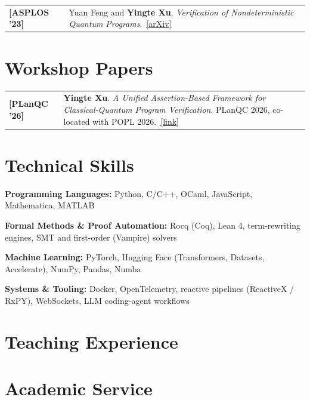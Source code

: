 \documentclass[11pt,a4paper]{moderncv}
\makeatletter
\newcommand*{\publication}[2]{%
  \begin{tabular*}{\maincolumnwidth}{%
    @{}p{2.6cm}@{}>{\raggedright\arraybackslash}p{\dimexpr\maincolumnwidth-2.6cm\relax}@{}}%
    {\bfseries #1} & #2\\%
  \end{tabular*}%
  \par\addvspace{.5em}}
\makeatother
\begin{document}
\publication{[ASPLOS '23]}{Yuan Feng and \textbf{Yingte Xu}. \emph{Verification of Nondeterministic Quantum Programs}.~\href{https://arxiv.org/abs/2302.07973}{[arXiv]}}



\section{Workshop Papers}

\publication{[PLanQC '26]}{\textbf{Yingte Xu}. \emph{A Unified Assertion-Based Framework for Classical-Quantum Program Verification}. PLanQC 2026, co-located with POPL 2026.~\href{https://popl26.sigplan.org/details/planqc-2026-papers/5/A-Unified-Assertion-Based-Framework-for-Classical-Quantum-Program-Verification}{[link]}}


\section{Technical Skills}
\textbf{Programming Languages:} Python, C/C++, OCaml, JavaScript, Mathematica, MATLAB

\textbf{Formal Methods \& Proof Automation:} Rocq (Coq), Lean 4, term-rewriting engines, SMT and first-order (Vampire) solvers

\textbf{Machine Learning:} PyTorch, Hugging Face (Transformers, Datasets, Accelerate), NumPy, Pandas, Numba

\textbf{Systems \& Tooling:} Docker, OpenTelemetry, reactive pipelines (ReactiveX / RxPY), WebSockets, LLM coding-agent workflows


\section{Teaching Experience}

\vspace{-1em}



\section{Academic Service}

\end{document}
